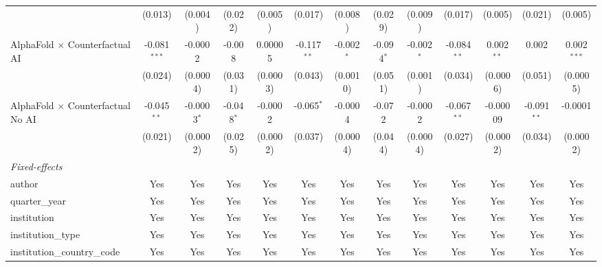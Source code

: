 \begin{tabular}{lcccccccccccc}
                                            & (0.013)        & (0.004)       & (0.022)       & (0.005)   & (0.017)       & (0.008)       & (0.029)       & (0.009)      & (0.017)       & (0.005)        & (0.021)       & (0.005)\\   
   AlphaFold $\times$ Counterfactual AI     & -0.081$^{***}$ & -0.0002       & -0.008        & 0.00005   & -0.117$^{**}$ & -0.002$^{*}$  & -0.094$^{*}$  & -0.002$^{*}$ & -0.084$^{**}$ & 0.002$^{**}$   & 0.002         & 0.002$^{***}$\\   
                                            & (0.024)        & (0.0004)      & (0.031)       & (0.0003)  & (0.043)       & (0.0010)      & (0.051)       & (0.001)      & (0.034)       & (0.0006)       & (0.051)       & (0.0005)\\   
   AlphaFold $\times$ Counterfactual No AI  & -0.045$^{**}$  & -0.0003$^{*}$ & -0.048$^{*}$  & -0.0002   & -0.065$^{*}$  & -0.0004       & -0.072        & -0.0002      & -0.067$^{**}$ & -0.00009       & -0.091$^{**}$ & -0.0001\\   
                                            & (0.021)        & (0.0002)      & (0.025)       & (0.0002)  & (0.037)       & (0.0004)      & (0.044)       & (0.0004)     & (0.027)       & (0.0002)       & (0.034)       & (0.0002)\\   
   \midrule
   \emph{Fixed-effects}\\
   author                                   & Yes            & Yes           & Yes           & Yes       & Yes           & Yes           & Yes           & Yes          & Yes           & Yes            & Yes           & Yes\\  
   quarter\_year                            & Yes            & Yes           & Yes           & Yes       & Yes           & Yes           & Yes           & Yes          & Yes           & Yes            & Yes           & Yes\\  
   institution                              & Yes            & Yes           & Yes           & Yes       & Yes           & Yes           & Yes           & Yes          & Yes           & Yes            & Yes           & Yes\\  
   institution\_type                        & Yes            & Yes           & Yes           & Yes       & Yes           & Yes           & Yes           & Yes          & Yes           & Yes            & Yes           & Yes\\  
   institution\_country\_code               & Yes            & Yes           & Yes           & Yes       & Yes           & Yes           & Yes           & Yes          & Yes           & Yes            & Yes           & Yes\\  

\end{tabular}

